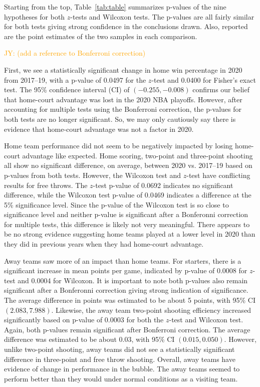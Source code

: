\documentclass[10pt]{article}
\newcommand{\jy}[1]{\textcolor{orange}{JY: (#1)}}
\begin{document}
Starting from the top,
Table~\ref{tab:table} summarizes p-values of the nine hypotheses for both
\(z\)-tests and Wilcoxon tests. The p-values are all fairly similar for both
tests giving strong confidence in the conclusions drawn. Also, reported are
the point estimates of the two samples in each comparison.

\jy{add a reference to Bonferroni correction}

First, we see a statistically significant change
in home win percentage in 2020 from 2017--19, with a p-value of 0.0497 for the
\(z\)-test and 0.0400 for Fisher's exact test. The 95\% confidence
interval (CI) of \((-0.255, -0.008)\)
confirms our belief that home-court advantage was lost in the 2020 NBA 
playoffs. However, after accounting for
multiple tests using the Bonferroni correction, the p-values for both
tests are no longer significant. So, we may only cautiously say there is 
evidence that home-court advantage was
not a factor in 2020.

Home team performance did not seem to be negatively impacted by losing home-court
advantage like expected. Home scoring, two-point and three-point
shooting all show no significant difference, on average, between 2020 vs.
2017--19 based on p-values from both tests. However, the Wilcoxon test and \(z\)-test have conflicting results
for free throws. The \(z\)-test p-value of 0.0692 indicates no significant difference, while
the Wilcoxon test p-value of 0.0469 indicates a difference at the 5\% significance level. Since
the p-value of the Wilcoxon test is so close to significance level and neither p-value is significant
after a Bonferonni correction for multiple tests, this difference is likely not very meaningful.
There appears to be no strong evidence suggesting home teams played at
a lower level in 2020 than they did in previous years when they had home-court advantage.

Away teams saw more of an impact than home teams. For starters, there is a
significant increase in mean points per game, indicated by p-value of 0.0008 for \(z\)-test and
0.0004 for Wilcoxon. It is important to note both p-values also remain significant after
a Bonferonni correction giving strong indication of significance. The
average difference in points was estimated to
be about 5 points, with 95\% CI \((2.083, 7.988)\). Likewise, the away team two-point
shooting efficiency increased significantly based on p-value of 0.0003
for both the \(z\)-test and Wilcoxon test. Again, both p-values remain significant after Bonferroni correction.
The average difference was estimated to be about 0.03, with 95\% CI \((0.015, 0.050)\). However,
unlike two-point shooting, away teams did not see a statistically significant difference in three-point and free
throw shooting. Overall, away teams have evidence of change in performance in
the bubble. The away teams seemed to perform better than they would under normal
conditions as a visiting team.
\end{document}
